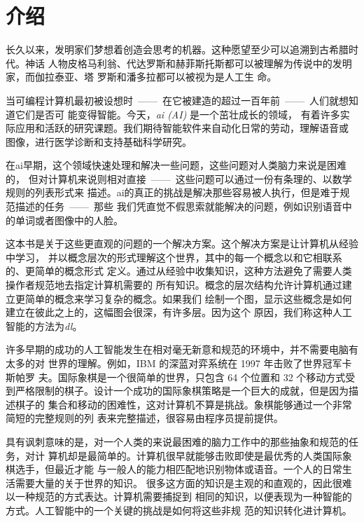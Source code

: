 
\chapter{介绍}
\label{ch:intro}

长久以来，发明家们梦想着创造会思考的机器。这种愿望至少可以追溯到古希腊时代。神话
人物皮格马利翁、代达罗斯和赫菲斯托斯都可以被理解为传说中的发明家，而伽拉泰亚、塔
罗斯和潘多拉都可以被视为是人工生
命\citep{ovid2004metamorphoses,sparkes1996red,1997works}。

当可编程计算机最初被设想时~——~在它被建造的超过一百年前~——~人们就想知道它们是否可
能变得智能\citep{Lovelace1842}。今天，\emph{\gls{ai} (AI)} 是一个茁壮成长的领域，
有着许多实际应用和活跃的研究课题。我们期待智能软件来自动化日常的劳动，理解语音或
图像，进行医学诊断和支持基础科学研究。

在\gls*{ai}早期，这个领域快速处理和解决一些问题，这些问题对人类脑力来说是困难的，
但对计算机来说则相对直接~——~这些问题可以通过一份有条理的、以数学规则的列表形式来
描述。\gls*{ai}的真正的挑战是解决那些容易被人执行，但是难于规范描述的任务~——~那些
我们凭直觉不假思索就能解决的问题，例如识别语音中的单词或者图像中的人脸。

这本书是关于这些更直观的问题的一个解决方案。这个解决方案是让计算机从经验中学习，
并以概念层次的形式理解这个世界，其中的每一个概念以和它相联系的、更简单的概念形式
定义。通过从经验中收集知识，这种方法避免了需要人类操作者规范地去指定计算机需要的
所有知识。概念的层次结构允许计算机通过建立更简单的概念来学习复杂的概念。如果我们
绘制一个图，显示这些概念是如何建立在彼此之上的，这幅图会很深，有许多层。因为这个
原因，我们称这种人工智能的方法为\emph{\gls{dl}}。

许多早期的成功的人工智能发生在相对毫无新意和规范的环境中，并不需要电脑有太多的对
世界的理解。例如，IBM 的深蓝对弈系统在 1997 年击败了世界冠军卡斯帕罗
夫\citep{Hsu2002}。国际象棋是一个很简单的世界，只包含 64 个位置和 32 个移动方式受
到严格限制的棋子。设计一个成功的国际象棋策略是一个巨大的成就，但是因为描述棋子的
集合和移动的困难性，这对计算机不算是挑战。象棋能够通过一个非常简短的完整规则的列
表来完整描述，很容易由程序员提前提供。

具有讽刺意味的是，对一个人类的来说最困难的脑力工作中的那些抽象和规范的任务，对计
算机却是最简单的。计算机很早就能够击败即使是最优秀的人类国际象棋选手，但最近才能
与一般人的能力相匹配地识别物体或语音。一个人的日常生活需要大量的关于世界的知识。
很多这方面的知识是主观的和直观的，因此很难以一种规范的方式表达。计算机需要捕捉到
相同的知识，以便表现为一种智能的方式。人工智能中的一个关键的挑战是如何将这些非规
范的知识转化进计算机。

